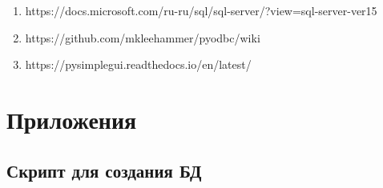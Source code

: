 \documentclass[a4paper,12pt,preview]{report} %
\begin{document}
	\begin{enumerate}
		\item https://docs.microsoft.com/ru-ru/sql/sql-server/?view=sql-server-ver15
		\item https://github.com/mkleehammer/pyodbc/wiki
		\item https://pysimplegui.readthedocs.io/en/latest/
	\end{enumerate}
	
	\chapter{Приложения}
	
	\section{Скрипт для создания БД}
\end{document}
